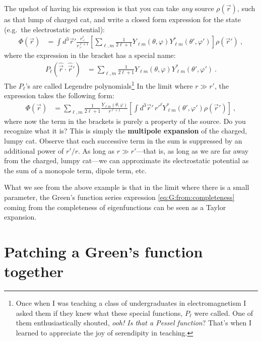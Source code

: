 \begin{example}
The upshot of having his expression is that you can take \emph{any} source $\rho(\vec{r})$, such as that lump of charged cat, and write a closed form expression for the state (e.g.\ the electrostatic potential):
\begin{align}
  \Phi(\vec{r})
  &=
  \int d^3 \vec{r}'
  \frac{r_<^\ell}{r_>^{\ell+1}}
  \left[
    \sum_{\ell, m}
    \frac{1}{2\ell+1}
    Y_{\ell m}(\theta, \varphi)
    Y_{\ell m}^*(\theta', \varphi')
  \right]
  \rho(\vec{r}') \ ,
\end{align}
where the expression in the bracket has a special name:
\begin{align}
  P_\ell(\hat{\vec{r}}\cdot\hat{\vec{r}}')
  &=
  \sum_{\ell, m}
    \frac{1}{2\ell+1}
    Y_{\ell m}(\theta, \varphi)
    Y_{\ell m}^*(\theta', \varphi') \ .
\end{align}
The $P_\ell$'s are called Legendre polynomials\footnote{Once when I was teaching a class of undergraduates in electromagnetism I asked them if they knew what these special functions, $P_\ell$ were called. One of them enthusiastically shouted, \emph{ooh! Is that a Pessel function}? That's when I learned to appreciate the joy of serendipity in teaching.} In the limit where $r\gg r'$, the expression takes the following form:
\begin{align}
  \Phi(\vec{r})
  &=
  \sum_{\ell, m}
  \frac{1}{2\ell+1}
  \frac{Y_{\ell m}(\theta, \varphi)}{r^{\ell+1}}
  \left[\int d^3 \vec{r}'
      \, r'^{\ell}
        Y_{\ell m}^*(\theta', \varphi')
        \rho(\vec{r}')\right] \ ,
\end{align}
where now the term in the brackets is purely a property of the source. Do you recognize what it is? This is simply the \textbf{multipole expansion} of the charged, lumpy cat. Observe that each successive term in the sum is suppressed by an additional power of $r'/r$. As long as $r\gg r'$---that is, as long as we are far away from the charged, lumpy cat---we can approximate its electrostatic potential as the sum of a monopole term, dipole term, etc. 
\end{example}
What we see from the above example is that in the limit where there is a small parameter, the Green's function series expression \eqref{eq:G:from:completeness} coming from the completeness of eigenfunctions can be seen as a Taylor expansion.


\section{Patching a Green's function together}
\label{sec:patching}

